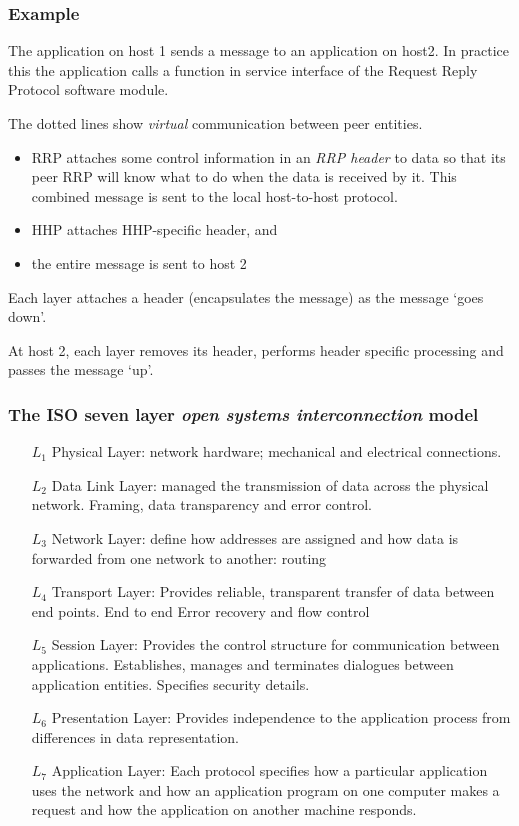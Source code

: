 \documentclass[10pt, hyperref={pdfpagelabels=false}]{beamer}
\begin{document}
\begin{frame}
\frametitle{Example}
The application on host 1 sends a message to an application on host2. In practice this the application calls a
function in service interface of the Request Reply Protocol software module.

The dotted lines show \emph{virtual} communication between peer entities.
\begin{itemize}
\item RRP attaches some control information in an \emph{RRP header} to data so that its peer RRP will know what to do when the data is received by it. This combined message is sent to the local host-to-host protocol.
\item HHP attaches HHP-specific header, and
\item the entire message is sent to host 2
\end{itemize}

Each layer attaches a header (encapsulates the message) as the message ‘goes down’.

At host 2, each layer removes its header, performs header specific
processing and passes the message ‘up’.
\end{frame}

\begin{frame}
\frametitle{The ISO seven layer \emph{open systems interconnection} model}
\begin{itemize}
\item[$L_1$] Physical Layer: network hardware; mechanical and electrical connections.
\item[$L_2$] Data Link Layer: managed the transmission of data across the physical network. Framing, data transparency and error control.
\item[$L_3$] Network Layer: define how addresses are assigned and how data is forwarded from one network to another: routing
\item[$L_4$] Transport Layer: Provides reliable, transparent transfer of data between end points. End to end Error recovery and flow control
\item[$L_5$] Session Layer: Provides the control structure for communication between applications. Establishes, manages and terminates dialogues between application entities. Specifies security details.
\item[$L_6$] Presentation Layer: Provides independence to the application process from differences in data representation.
\item[$L_7$] Application Layer: Each protocol specifies how a particular application uses the network and how an application program on one computer makes a request and how the application on another machine responds.
\end{itemize}
\end{frame}
\end{document}
